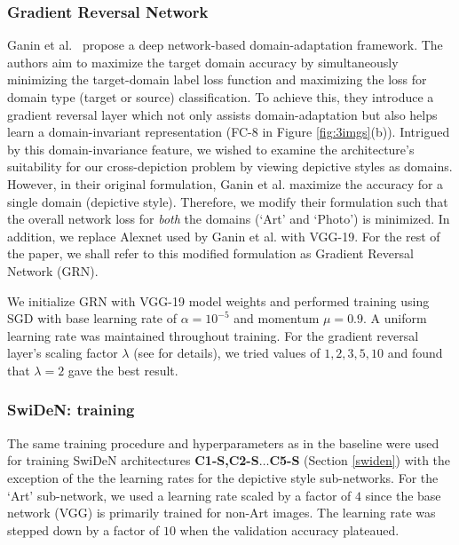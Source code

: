 \documentclass[preprint]{sig-alternate-05-2015}
\begin{document}
\subsubsection{Gradient Reversal Network}
\label{grn}

Ganin et al.~\cite{ganin2015unsupervised} propose a deep network-based domain-adaptation framework. The authors aim to maximize the target domain accuracy by simultaneously minimizing the target-domain label loss function and maximizing the loss for domain type (target or source) classification. To achieve this, they introduce a gradient reversal layer which not only assists domain-adaptation but also helps learn a domain-invariant representation (FC-8 in Figure \ref{fig:3imgs}(b)). Intrigued by this domain-invariance feature, we wished to examine the architecture's suitability for our cross-depiction problem by viewing depictive styles as domains. However, in their original formulation, Ganin et al. maximize the accuracy for a single domain (depictive style). Therefore, we modify their formulation such that the overall network loss for \textit{both} the domains (`Art' and `Photo') is minimized. In addition, we replace Alexnet used by Ganin et al. with VGG-19. For the rest of the paper, we shall refer to this modified formulation as Gradient Reversal Network (GRN). 

We initialize GRN with VGG-19 model weights and performed training using SGD with base learning rate of $\alpha=10^{-5}$ and momentum $\mu=0.9$. A uniform learning rate was maintained throughout training. For the gradient reversal layer's scaling factor $\lambda$ (see \cite{ganin2015unsupervised} for details), we tried values of $1,2,3,5,10$ and  found that $\lambda=2$ gave the best result.  

\subsubsection{SwiDeN: training}
\label{swtr}

The same training procedure and hyperparameters as in the baseline were used for training SwiDeN architectures \textbf{C1-S,C2-S}$\ldots$\textbf{C5-S} (Section \ref{swiden}) with the exception of the the learning rates for the depictive style sub-networks. For the `Art' sub-network, we used a learning rate scaled by a factor of $4$ since the base network (VGG) is primarily trained for non-Art images. The learning rate was stepped down by a factor of $10$ when the validation accuracy plateaued.
\end{document}
